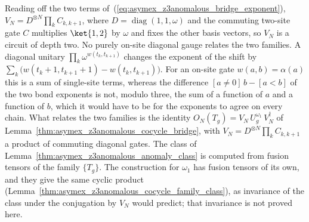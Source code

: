 Reading off the two terms of~(\ref{eq:asymex_z3anomalous_bridge_exponent}),
$V_N=D^{\otimes N}\prod_kC_{k,k+1}$, where $D=\operatorname{diag}(1,1,\omega)$
and the commuting two-site gate $C$ multiplies $\ket{1,2}$ by $\omega$ and fixes
the other basis vectors, so $V_N$ is a circuit of depth two.
No purely on-site diagonal gauge relates the two families. A diagonal
unitary $\prod_k\omega^{w(t_k,t_{k+1})}$ changes the exponent of the shift
by $\sum_k\bigl(w(t_k+1,t_{k+1}+1)-w(t_k,t_{k+1})\bigr)$. For an on-site
gate $w(a,b)=\alpha(a)$ this is a sum of single-site terms, whereas the
difference $[a\neq0]\,b-[a<b]$ of the two bond exponents is not, modulo
three, the sum of a function of $a$ and a function of $b$, which it would
have to be for the exponents to agree on every chain. What relates the two
families is the identity $O_N(T_g)=V_N\,U^{\omega_1}_g\,V_N^\dagger$ of
Lemma~\ref{thm:asymex_z3anomalous_cocycle_bridge}, with
$V_N=D^{\otimes N}\prod_kC_{k,k+1}$ a product of commuting diagonal gates.
The class of Lemma~\ref{thm:asymex_z3anomalous_anomaly_class} is computed from fusion
tensors of the family $\{T_g\}$. The construction for $\omega_1$ has fusion
tensors of its own, and they give the same cyclic product
(Lemma~\ref{thm:asymex_z3anomalous_cocycle_family_class}), as invariance of
the class under the conjugation by $V_N$ would predict; that invariance is not
proved here.

